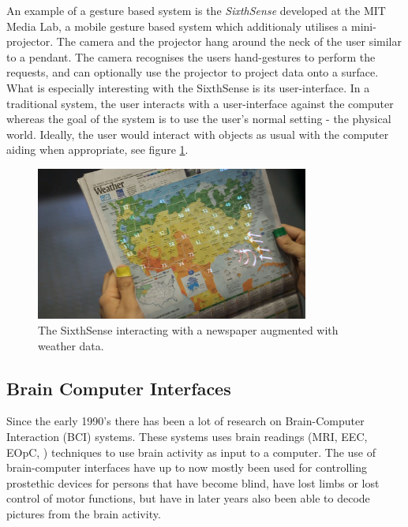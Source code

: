 An example of a gesture based system is the \emph{SixthSense} developed at the MIT Media Lab, a mobile gesture based system which additionaly utilises a mini-projector. The camera and the projector hang around the neck of the user similar to a pendant. The camera recognises the users hand-gestures to perform the requests, and can optionally use the projector to project data onto a surface. What is especially interesting with the SixthSense is its user-interface. In a traditional system, the user interacts with a user-interface against the computer whereas the goal of the system is to use the user's normal setting - the physical world\cite{Mistry:2009:SWG:1667146.1667160}. Ideally, the user would interact with objects as usual with the computer aiding when appropriate, see figure \ref{sixthsense}.


\begin{figure}[]
\includegraphics[width=0.8\textwidth] {bilder/newspaper.jpg}
\caption{The SixthSense interacting with a newspaper augmented with weather data.}
\label{sixthsense}
\end{figure}
\nocite{newspaper}


\subsection{Brain Computer Interfaces}

Since the early 1990's there has been a lot of research on Brain-Computer Interaction (BCI) systems. These systems uses brain readings (MRI, EEC, EOpC, ) techniques to use brain activity as input to a computer. The use of brain-computer interfaces have up to now mostly been used for controlling prostethic devices for persons that have become blind, have lost limbs or lost control of motor functions\cite{lebedev2006brain}, but have in later years also been able to decode pictures from the brain activity\cite{miyawaki2008visual}.

